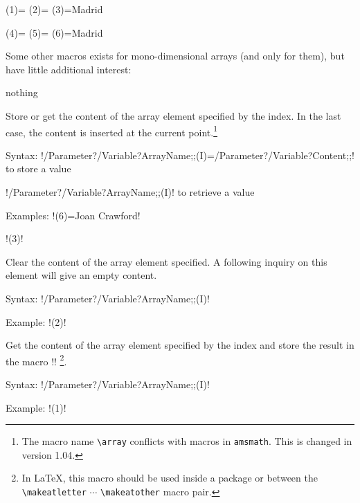 \documentclass{article}
\newenvironment{Description}[1]{%
\begin{list}{nothing}{\setlength{\leftmargin}{#1}
\setlength{\labelwidth}{\leftmargin}\setlength{\labelsep}{1mm}}}
{\end{list}}
\newcommand{\BS}{\texttt{\symbol{`\\}}}
\newcommand{\Macro}[1]{\texttt{\BS#1}}
\newcommand{\FormatTeXMacro}[1]{\Macro{#1}\hfill :}
\begin{document}
\begin{SideBySideExample}[xrightmargin=6cm]
  \newarray\Data
  \newcount\CounterP            %
  \setcounter{CounterL}{3}
  \def\Town{Madrid}
  \Data(1)={\the\CounterP}
  \Data(2)={\the\value{CounterL}}
  \Data(3)={\Town}

  \expandarrayelementtrue
  \Data(4)={\the\CounterP}
  \Data(5)={\the\value{CounterL}}
  \Data(6)={\Town}

  \setcounter{CounterL}{5}
  \def\Town{Roma}

  \multido{\iData=1+1}{6}{%
    \BS\texttt{Data(\iData)}=`\Data(\iData)'\\}
\end{SideBySideExample}

\vspace{3mm}
\noindent Some other macros exists for mono-dimensional arrays (and only for
them), but have little additional interest:

\begin{Description}{4cm}
  \item[\FormatTeXMacro{array}] Store or get the content of the array element
  specified by the index. In the last case, the content is inserted at the
  current point.\footnote{The macro name \verb|\array| conflicts with macros in {\tt amsmath}. This is changed in version 1.04.}

       Syntax: !\array/Parameter?/Variable?ArrayName;;(I)=/Parameter?/Variable?Content;;!
               to store a value

               \hspace{1.3cm}!\array/Parameter?/Variable?ArrayName;;(I)! to retrieve a value

       Examples: !(6)={Joan Crawford}!

                 \hspace{1.75cm}!(3)!

  \item[\FormatTeXMacro{clrarray}] Clear the content of the array element specified.
  A following inquiry on this element will give an empty content.

       Syntax: !\clrarray/Parameter?/Variable?ArrayName;;(I)!

       Example: !(2)!

  \item[\FormatTeXMacro{testarray}]  Get the content of the array element specified
  by the index and store the result in the macro !\temp@macro!%
  \footnote{In \LaTeX, this macro should be used inside a package or between
  the \verb+\makeatletter+ $\cdots$ \verb+\makeatother+ macro pair.}.

       Syntax: !\testarray/Parameter?/Variable?ArrayName;;(I)!

       Example: !(1)!
\end{Description}
\end{document}

